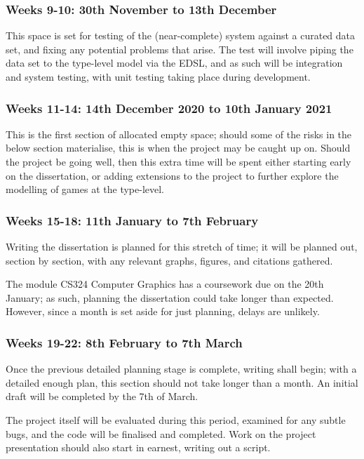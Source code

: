 \documentclass[12pt, a4paper]{scrartcl}
\begin{document}
\subsubsection{Weeks 9-10: 30th November to 13th December}

This space is set for testing of the (near-complete) system against a curated data set, and fixing any potential problems that arise. The test will involve piping the data set to the type-level model via the EDSL, and as such will be integration and system testing, with unit testing taking place during development.

\subsubsection{Weeks 11-14: 14th December 2020 to 10th January 2021}

This is the first section of allocated empty space; should some of the risks in the below section materialise, this is when the project may be caught up on. Should the project be going well, then this extra time will be spent either starting early on the dissertation, or adding extensions to the project to further explore the modelling of games at the type-level.

\subsubsection{Weeks 15-18: 11th January to 7th February}

Writing the dissertation is planned for this stretch of time; it will be planned out, section by section, with any relevant graphs, figures, and citations gathered.

The module CS324 Computer Graphics has a coursework due on the 20th January; as such, planning the dissertation could take longer than expected. However, since a month is set aside for just planning, delays are unlikely.

\subsubsection{Weeks 19-22: 8th February to 7th March}

Once the previous detailed planning stage is complete, writing shall begin; with a detailed enough plan, this section should not take longer than a month. An initial draft will be completed by the 7th of March.

The project itself will be evaluated during this period, examined for any subtle bugs, and the code will be finalised and completed. Work on the project presentation should also start in earnest, writing out a script.
\end{document}
